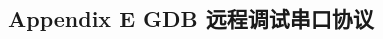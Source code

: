 \documentclass[class=book, crop=false]{standalone}
\begin{document}
\begin{CJK}{UTF8}{gbsn}

\chapter*{Appendix E GDB 远程调试串口协议}









































\cleardoublepage

\end{CJK}
\end{document}
